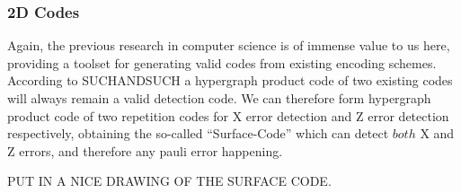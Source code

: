 \subsubsection{2D Codes}
Again, the previous research in computer science is of immense
value to us here, providing a toolset for generating valid codes
from existing encoding schemes. 
According to SUCHANDSUCH a hypergraph product code of two 
existing codes will always remain a valid detection code.
We can therefore form hypergraph product code of two repetition
codes for X error detection and Z error detection respectively,
obtaining the so-called ``Surface-Code'' which can detect
$both$ X and Z errors, and therefore any pauli error happening.

PUT IN A NICE DRAWING OF THE SURFACE CODE.
